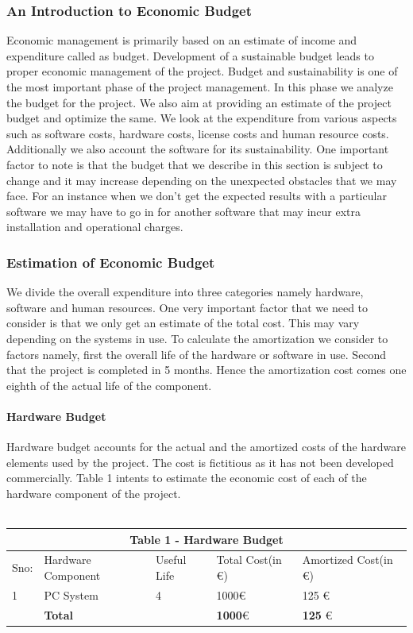 \subsubsection{An Introduction to Economic Budget}
Economic management is primarily based on an estimate of income and expenditure called as
budget. Development of a sustainable budget leads to proper economic management of the
project. Budget and sustainability is one of the most important phase of the project
management. In this phase we analyze the budget for the project. We also aim at providing an
estimate of the project budget and optimize the same. We look at the expenditure from various
aspects such as software costs, hardware costs, license costs and human resource costs.
Additionally we also account the software for its sustainability. One important factor to note is
that the budget that we describe in this section is subject to change and it may increase
depending on the unexpected obstacles that we may face. For an instance when we don’t get
the expected results with a particular software we may have to go in for another software that
may incur extra installation and operational charges.
\subsubsection{Estimation of Economic Budget}
We divide the overall expenditure into three categories namely hardware, software and human
resources. One very important factor that we need to consider is that we only get an estimate
of the total cost. This may vary depending on the systems in use. To calculate the amortization
we consider to factors namely, first the overall life of the hardware or software in use. Second
that the project is completed in 5 months. Hence the amortization cost comes one eighth
of the actual life of the component.

\paragraph{Hardware Budget} Hardware budget accounts for the actual and the amortized costs of the hardware elements
used by the project. The cost is fictitious as it has not been developed commercially. Table 1
intents to estimate the economic cost of each of the hardware component of the project.
\\\\
\begin{tabular}{|p{1cm}||p{3cm}|p{2cm}|p{3cm}|p{3cm}|}
 \hline
 \multicolumn{5}{|c|}{Table 1 - Hardware Budget} \\
 \hline
 Sno: & Hardware Component&Useful Life &Total Cost(in \euro) &Amortized Cost(in \euro)\\
 \hline
1   & PC System  &4 &  1000\euro  & 125 \euro \\
\hline
\hline
   & \textbf{Total}  &  &  \textbf{1000}\euro  & \textbf{125} \euro \\
 \hline
\end{tabular}

